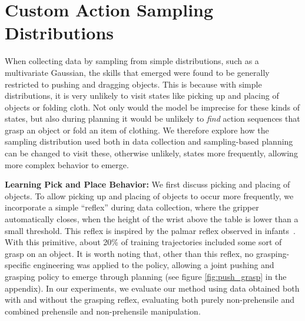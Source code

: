 \section{Custom Action Sampling Distributions}

\label{sec:system}
When collecting data by sampling from simple distributions, such as a multivariate Gaussian, the skills that emerged were found to be generally restricted to pushing and dragging objects. This is because with simple distributions, it is very unlikely to visit states like picking up and placing of objects or folding cloth. Not only would the model be imprecise for these kinds of states, but also during planning it would be unlikely to \emph{find} action sequences that grasp an object or fold an item of clothing.
We therefore explore how the sampling distribution used both in data collection and sampling-based planning can be changed to visit these, otherwise unlikely, states more frequently, allowing more complex behavior to emerge. 

\noindent \textbf{Learning Pick and Place Behavior:}
We first discuss picking and placing of objects. To allow picking up and placing of objects to occur more frequently, we incorporate a simple ``reflex'' during data collection, where the gripper automatically closes, when the height of the wrist above the table is lower than a small threshold. This reflex is inspired by the palmar reflex observed in infants~\cite{grasping_fetal}. With this primitive, about 20\% of training trajectories included some sort of grasp on an object. It is worth noting that, other than this reflex, no grasping-specific engineering was applied to the policy, allowing a joint pushing and grasping policy to emerge through planning (see figure \ref{fig:push_grasp} in the appendix). In our experiments, we evaluate our method using data obtained both with and without the grasping reflex, evaluating both purely non-prehensile and combined prehensile and non-prehensile manipulation.

